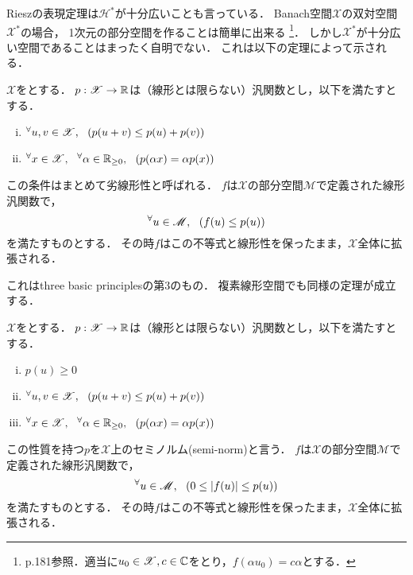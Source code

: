 \documentclass[a4j]{jsarticle}
\newcommand{\spX}{\mathscr{X}}
\begin{document}
    Rieszの表現定理は$\mathscr{H}^{\ast}$が十分広いことも言っている．
    Banach空間$\spX$の双対空間$\spX^{\ast}$の場合，
    1次元の部分空間を作ることは簡単に出来る
    \footnote{p.181参照．適当に$u_0 \in \spX, c \in \C$をとり，$f(\alpha u_0)=c \alpha$とする．}．
    しかし$\spX^{\ast}$が十分広い空間であることはまったく自明でない．
    これは以下の定理によって示される．
    \begin{Thm} \label{them8:11}
        $\spX$をとする．
        $p:\spX \to \R$は（線形とは限らない）汎関数とし，以下を満たすとする．
        \begin{enumerate}[i)]
            \setlength{\leftskip}{5truemm}
        \item $\Forall{u, v \in \spX} (p(u+v) \leq p(u)+p(v))$ 
        \item $\Forall{x \in \spX} \Forall{\alpha \in \R_{\geq 0}} (p(\alpha x) = \alpha p(x))$
        \end{enumerate}
        この条件はまとめて劣線形性と呼ばれる．
        $f$は$\spX$の部分空間$\mathscr{M}$で定義された線形汎関数で，
        \[ {}^{\forall} u \in \mathscr{M},~~ (f(u) \leq p(u)) \]
        を満たすものとする．
        その時$f$はこの不等式と線形性を保ったまま，$\spX$全体に拡張される．
    \end{Thm}
    これはthree basic principlesの第3のもの．
    複素線形空間でも同様の定理が成立する．

    \begin{Thm}[定理8.13, p.184] \label{them8:13}
        $\spX$をとする．
        $p:\spX \to \R$は（線形とは限らない）汎関数とし，以下を満たすとする．
        \begin{enumerate}[i)]
            \setlength{\leftskip}{5truemm}
            \item $p(u) \geq 0$
            \item $\Forall{ u, v \in \spX} (p(u+v) \leq p(u)+p(v))$ 
            \item $\Forall{ x \in \spX} \Forall{\alpha \in \R_{\geq 0}} (p(\alpha x) = \alpha p(x))$
        \end{enumerate}
        この性質を持つ$p$を$\spX$上のセミノルム(semi-norm)と言う．
        $f$は$\spX$の部分空間$\mathscr{M}$で定義された線形汎関数で，
        \[ {}^{\forall} u \in \mathscr{M},~~ (0 \leq |f(u)| \leq p(u)) \]
        を満たすものとする．
        その時$f$はこの不等式と線形性を保ったまま，$\spX$全体に拡張される．
    \end{Thm}
\end{document}

